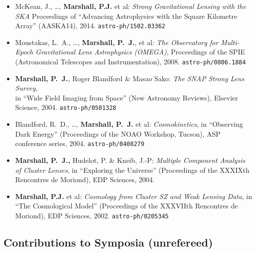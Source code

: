 \begin{itemize}

\item{McKean, J., \ldots, \textbf{Marshall, P.J.} et al:
\textit{Strong Gravitational Lensing with the SKA}
Proceedings of ``Advancing Astrophysics with the Square Kilometre Array'' (AASKA14), 2014.
\texttt{astro-ph/1502.03362}
}

\item{{Moustakas}, L.~A., \dots, \textbf{Marshall, P.~J.}, et al:
\textit{The Observatory for Multi-Epoch Gravitational Lens Astrophysics (OMEGA)},
Proceedings of the SPIE (Astronomical Telescopes and Instrumentation), 2008.
\texttt{astro-ph/0806.1884}
}

\item{\textbf{Marshall, P.~J.}, Roger Blandford \& Masao Sako:
\textit{The SNAP Strong Lens Survey},\\
in ``Wide Field Imaging from Space'' (New Astronomy Reviews), Elsevier Science, 2004.
\texttt{astro-ph/0501328}
}

\item{{Blandford}, R.~D., \ldots, \textbf{{Marshall}, P.~J.} et al:
\textit{Cosmokinetics},
in ``Observing Dark Energy'' (Proceedings of the NOAO Workshop, Tucson), ASP conference series, 2004.
\texttt{astro-ph/0408279}
}

\item{\textbf{{Marshall}, P.~J.,} {Hudelot}, P. \& {Kneib}, J.-P:
\textit{Multiple Component Analysis of Cluster Lenses},
in ``Exploring the Universe'' (Proceedings of the XXXIXth Rencontres de Moriond), EDP Sciences, 2004.
}

\item{\textbf{Marshall, P.J.} et al:
\textit{Cosmology from Cluster SZ and Weak Lensing Data},
in ``The Cosmological Model'' (Proceedings of the XXXVIIth Rencontres de Moriond), EDP Sciences, 2002.
\texttt{astro-ph/0205345}
}

\end{itemize}

\vspace{2\baselineskip}


\subsection*{Contributions to Symposia (unrefereed)}

